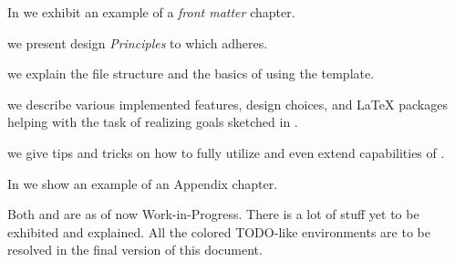  \label{ch:Quick Summary}

\vspace{2ex} %


In \textbf{} we exhibit an example of a \emph{front matter} chapter.

 we present design \emph{Principles} to which \TeXsis{} adheres.

 we explain the file structure and the basics of using the template.

 we describe various implemented features, design choices, and \LaTeX{} packages helping with the task of realizing goals sketched in .

 we give tips and tricks on how to fully utilize and even extend capabilities of \TeXsis{}.

In \textbf{} we show an example of an Appendix chapter.

\begin{Note}
    Both  and  are as of now Work-in-Progress.
    There is a lot of stuff yet to be exhibited and explained.
    All the colored \textsf{TODO}-like environments are to be resolved in the final version of this document.
\end{Note}
